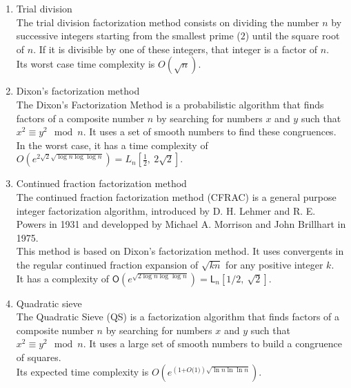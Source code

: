 \documentclass[sigconf,balance=false]{acmart}
\begin{document}
\begin{enumerate}
\item Trial division \\
The trial division factorization method consists on dividing the number $n$ by successive integers starting from the smallest prime ($2$) until the square root of $n$. If it is divisible by one of these integers, that integer is a factor of $n$.\\
Its worst case time complexity is $\displaystyle O\left(\sqrt{n}\right)$.\\
\item Dixon's factorization method \ \\
The Dixon's Factorization Method is a probabilistic algorithm that finds factors of a composite number $n$ by searching for numbers $x$ and $y$ such that $x^2 \equiv y^2 \mod n$. It uses a set of smooth numbers to find these congruences.\\
In the worst case, it has a time complexity of \\ $O\left(e^{2\sqrt{2}\sqrt{\log n \log\log n}}\right)=L_{n}\left[\frac{1}{2}, \ 2\sqrt{2} \right]$. \ \\

\item Continued fraction factorization method \ \\
The continued fraction factorization method (CFRAC) is a general purpose integer factorization algorithm, introduced by D. H. Lehmer and R. E. Powers in 1931 and developped by Michael A. Morrison and John Brillhart in 1975.\\
This method is based on Dixon's factorization method. It uses convergents in the regular continued fraction expansion of $\sqrt{kn}$ for any positive integer $k$.\\
It has a complexity of $\displaystyle\mathsf{O}\left(e^{\sqrt{2\log n \log \log n}} \right)=\displaystyle\mathsf{L}_{n}\left[1/2, \ \sqrt{2}\right]$. \\

\item Quadratic sieve \ \\
The Quadratic Sieve (QS) is a factorization algorithm that finds factors of a composite number $n$ by searching for numbers $x$ and $y$ such that $x^2 \equiv y^2 \mod n$. It uses a large set of smooth numbers to build a congruence of squares.\\
Its expected time complexity is $O\left(e^{\left(1\text{+}O\text{(}1\text{)}\right)\sqrt{\ln n \ln \ln n}} \right)$. \ \\


\end{enumerate}
\end{document}
